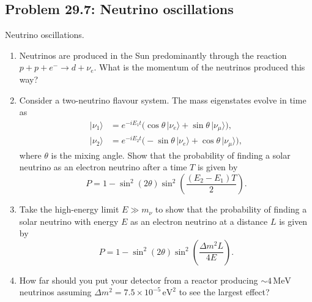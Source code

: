 \documentclass[a4paper,11pt]{article}
\begin{document}
\subsection[Problem 29.7: Neutrino oscillations]{Problem 29.7: Neutrino oscillations}

Neutrino oscillations.

\begin{enumerate}
  \item Neutrinos are produced in the Sun predominantly through the reaction
  $p+p+e^-\to d+\nu_e$. What is the momentum of the neutrinos produced this
  way?

  \item Consider a two-neutrino flavour system. The mass eigenstates evolve in
  time as
  \begin{align}
    |\nu_1\rangle
      &=e^{-iE_1t}\bigl(\cos\theta\,|\nu_e\rangle
        +\sin\theta\,|\nu_\mu\rangle\bigr),\\
    |\nu_2\rangle
      &=e^{-iE_2t}\bigl(-\sin\theta\,|\nu_e\rangle
        +\cos\theta\,|\nu_\mu\rangle\bigr),
  \end{align}
  where $\theta$ is the mixing angle. Show that the probability of finding a
  solar neutrino as an electron neutrino after a time $T$ is given by
  \begin{equation}
    P=1-\sin^2(2\theta)\sin^2\!\left(\frac{(E_2-E_1)T}{2}\right).
    \label{eq:b}
  \end{equation}

  \item Take the high-energy limit $E\gg m_\nu$ to show that the
  probability of finding a solar neutrino with energy $E$ as an electron
  neutrino at a distance $L$ is given by
  \begin{equation}
    P=1-\sin^2(2\theta)\sin^2\!\left(\frac{\Delta m^2L}{4E}\right).
  \end{equation}

  \item How far should you put your detector from a reactor producing
  $\sim4\,\mathrm{MeV}$ neutrinos assuming
  $\Delta m^2=7.5\times10^{-5}\,\mathrm{eV}^2$ to see the largest effect?
\end{enumerate}
\end{document}
